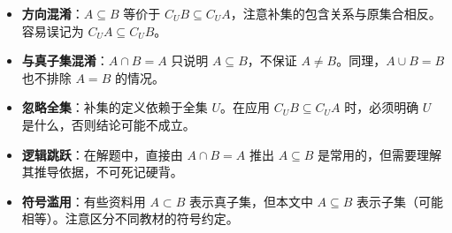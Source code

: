 \begin{trapbox}
\begin{itemize}
    \item \textbf{方向混淆}：$A\subseteq B$ 等价于 $C_U B \subseteq C_U A$，注意补集的包含关系与原集合相反。容易误记为 $C_U A \subseteq C_U B$。
    \item \textbf{与真子集混淆}：$A\cap B = A$ 只说明 $A\subseteq B$，不保证 $A\neq B$。同理，$A\cup B = B$ 也不排除 $A=B$ 的情况。
    \item \textbf{忽略全集}：补集的定义依赖于全集 $U$。在应用 $C_U B \subseteq C_U A$ 时，必须明确 $U$ 是什么，否则结论可能不成立。
    \item \textbf{逻辑跳跃}：在解题中，直接由 $A\cap B = A$ 推出 $A\subseteq B$ 是常用的，但需要理解其推导依据，不可死记硬背。
    \item \textbf{符号滥用}：有些资料用 $A\subset B$ 表示真子集，但本文中 $A\subseteq B$ 表示子集（可能相等）。注意区分不同教材的符号约定。
\end{itemize}
\end{trapbox}